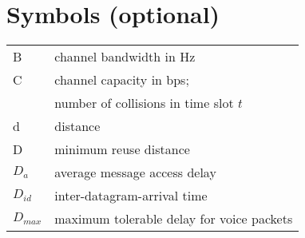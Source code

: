 \chapter*{Symbols (optional)}

\noindent
\begin{tabular}{ll} %
B & channel bandwidth in Hz \\
C & channel capacity in bps; \\
  & number of collisions in time slot $t$ \\
d & distance \\
D & minimum reuse distance \\
$D_a$ & average message access delay \\
$D_{id}$ & inter-datagram-arrival time \\
$D_{max}$ & maximum tolerable delay for voice packets \\
\end{tabular}